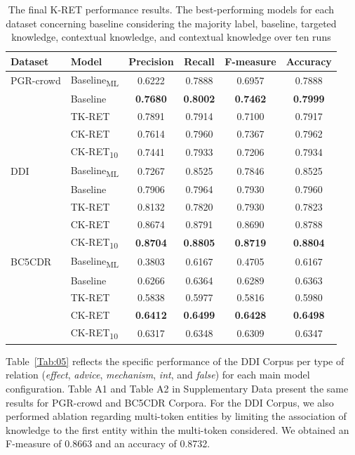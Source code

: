 \begin{table}[h]
\centering
\caption[Final K-RET Performance Results]{The final K-RET performance results. The best-performing models for each dataset concerning baseline considering the majority label, baseline, targeted knowledge, contextual knowledge, and contextual knowledge over ten runs\label{Tab:04}} 
\begin{tabular}{@{}llcccc@{}}\hline
Dataset & Model & Precision & Recall & F-measure & Accuracy\\\hline
PGR-crowd & Baseline\textsubscript{ML} & 0.6222 & 0.7888 & 0.6957 & 0.7888\\
& Baseline & \textbf{0.7680} & \textbf{0.8002} & \textbf{0.7462} & \textbf{0.7999}\\
& TK-RET & 0.7891 & 0.7914 & 0.7100 & 0.7917\\
& CK-RET & 0.7614 & 0.7960 & 0.7367 & 0.7962\\\cline{2-6}

& CK-RET\textsubscript{10} & 0.7441 & 0.7933 & 0.7206 & 0.7934\\
\hline

DDI & Baseline\textsubscript{ML} & 0.7267 & 0.8525 & 0.7846 & 0.8525\\
& Baseline & 0.7906 & 0.7964 & 0.7930 & 0.7960\\
& TK-RET & 0.8132 & 0.7820 & 0.7930 & 0.7823\\
& CK-RET & 0.8674 & 0.8791 & 0.8690 & 0.8788\\\cline{2-6}

& CK-RET\textsubscript{10} & \textbf{0.8704} & \textbf{0.8805} & \textbf{0.8719} & \textbf{0.8804} \\\hline

BC5CDR & Baseline\textsubscript{ML} & 0.3803 & 0.6167 & 0.4705 & 0.6167\\
 & Baseline & 0.6266 & 0.6364 & 0.6289 & 0.6363\\
& TK-RET & 0.5838 & 0.5977 & 0.5816 & 0.5980\\
& CK-RET & \textbf{0.6412} & \textbf{0.6499} & \textbf{0.6428} & \textbf{0.6498}\\\cline{2-6}

\rule{0pt}{3.2ex} & CK-RET\textsubscript{10} & 0.6317 & 0.6348 & 0.6309 & 0.6347 \\\hline
\end{tabular}
\end{table}

Table~\ref{Tab:05} reflects the specific performance of the DDI Corpus per type of relation (\textit{effect}, \textit{advice}, \textit{mechanism}, \textit{int}, and \textit{false}) for each main model configuration. Table A1 and Table A2 in Supplementary Data present the same results for PGR-crowd and BC5CDR Corpora. For the DDI Corpus, we also performed ablation regarding multi-token entities by limiting the association of knowledge to the first entity within the multi-token considered. We obtained an F-measure of 0.8663 and an accuracy of 0.8732.    

